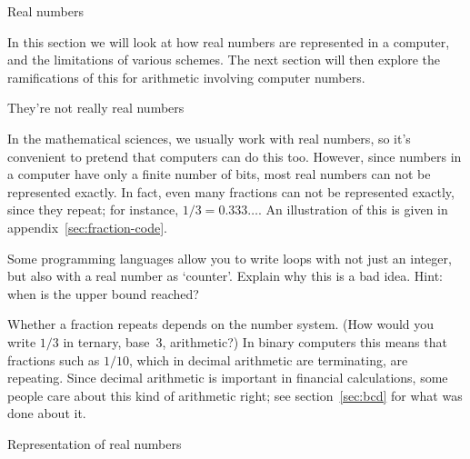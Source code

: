  {Real numbers}

In this section we will look at how real numbers are
represented in a computer, and the limitations of various schemes. The
next section will then explore the ramifications of this for arithmetic
involving computer numbers.

 {They're not really real numbers}
\label{sec:arith-intro}

In the mathematical sciences, we usually work with real numbers, so
it's convenient to pretend that computers can do this too. However,
since numbers in a computer have only a finite number of bits, most
real numbers can not be represented exactly. In fact, even many
fractions can not be represented exactly, since they repeat; for
instance, $1/3=0.333\ldots$. An illustration of this is given in
appendix~\ref{sec:fraction-code}.

\begin{exercise}
  Some programming languages allow you to write loops with not just an
  integer, but also with a real number as `counter'. Explain why this
  is a bad idea. Hint: when is the upper bound reached?
\end{exercise}

Whether a fraction repeats depends on the number system. (How would
you write $1/3$ in ternary, base~3, arithmetic?) In binary computers
this means that fractions such as $1/10$, which in decimal arithmetic
are terminating, are repeating. Since decimal arithmetic is important
in financial calculations, some
people care about this kind of arithmetic right;
see section~\ref{sec:bcd} for what was done about it.

 {Representation of real numbers}
\label{sec:float-representation}

